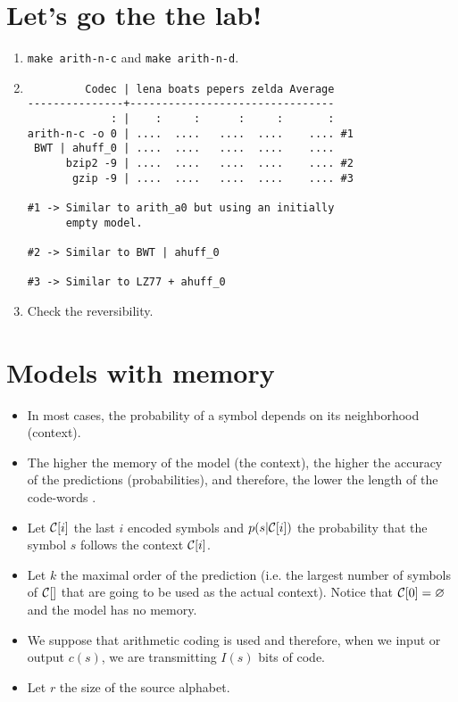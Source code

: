 \section*{Let's go the the lab!}
\begin{enumerate}
\item \texttt{make arith-n-c} and \texttt{make arith-n-d}.
\item
\begin{verbatim}
         Codec | lena boats pepers zelda Average
---------------+--------------------------------
             : |    :     :      :     :       :
arith-n-c -o 0 | ....  ....   ....  ....    .... #1
 BWT | ahuff_0 | ....  ....   ....  ....    ....
      bzip2 -9 | ....  ....   ....  ....    .... #2
       gzip -9 | ....  ....   ....  ....    .... #3

#1 -> Similar to arith_a0 but using an initially
      empty model.

#2 -> Similar to BWT | ahuff_0

#3 -> Similar to LZ77 + ahuff_0
\end{verbatim}
\item Check the reversibility.
\end{enumerate}

\section{Models with memory}
\begin{itemize}
\item In most cases, the probability of a symbol depends on its
  neighborhood (context).
\item The higher the memory of the model (the context), the higher the
  accuracy of the predictions (probabilities), and therefore, the
  lower the length of the code-words \cite{Cleary.PPM}.
\item Let ${\cal C}[i]$ the last $i$ encoded symbols and $p(s|{\cal C}[i])$ the
  probability that the symbol $s$ follows the context ${\cal C}[i]$.
\item Let $k$ the maximal order of the prediction (i.e. the largest
  number of symbols of ${\cal C}[]$ that are going to be used as the
  actual context). Notice that ${\cal C}[0]=\varnothing$ and the model
  has no memory.
\item We suppose that arithmetic coding is used and therefore, when we
  input or output $c(s)$, we are transmitting $I(s)$ bits of code.
\item Let $r$ the size of the source alphabet.
\end{itemize}

